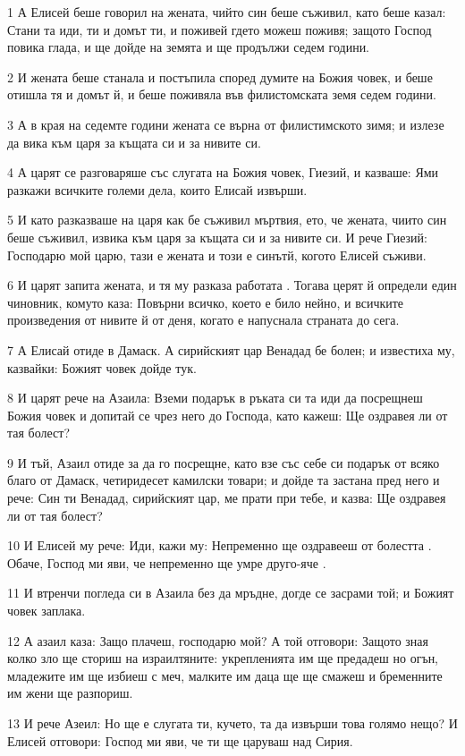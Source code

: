\par 1 А Елисей беше говорил на жената, чийто син беше съживил, като беше казал: Стани та иди, ти и домът ти, и поживей гдето можеш поживя; защото Господ повика глада, и ще дойде на земята и ще продължи седем години.
\par 2 И жената беше станала и постъпила според думите на Божия човек, и беше отишла тя и домът й, и беше поживяла във филистомската земя седем години.
\par 3 А в края на седемте години жената се върна от филистимското зимя; и излезе да вика към царя за къщата си и за нивите си.
\par 4 А царят се разговаряше със слугата на Божия човек, Гиезий, и казваше: Ями разкажи всичките големи дела, които Елисай извърши.
\par 5 И като разказваше на царя как бе съживил мъртвия, ето, че жената, чиито син беше съживил, извика към царя за къщата си и за нивите си. И рече Гиезий: Господарю мой царю, тази е жената и този е синътй, когото Елисей съживи.
\par 6 И царят запита жената, и тя му разказа работата . Тогава церят й определи един чиновник, комуто каза: Повърни всичко, което е било нейно, и всичките произведения от нивите й от деня, когато е напуснала страната до сега.
\par 7 А Елисай отиде в Дамаск. А сирийският цар Венадад бе болен; и известиха му, казвайки: Божият човек дойде тук.
\par 8 И царят рече на Азаила: Вземи подарък в ръката си та иди да посрещнеш Божия човек и допитай се чрез него до Господа, като кажеш: Ще оздравея ли от тая болест?
\par 9 И тъй, Азаил отиде за да го посрещне, като взе със себе си подарък от всяко благо от Дамаск, четиридесет камилски товари; и дойде та застана пред него и рече: Син ти Венадад, сирийският цар, ме прати при тебе, и казва: Ще оздравея ли от тая болест?
\par 10 И Елисей му рече: Иди, кажи му: Непременно ще оздравееш от болестта . Обаче, Господ ми яви, че непременно ще умре друго-яче .
\par 11 И втренчи погледа си в Азаила без да мръдне, догде се засрами той; и Божият човек заплака.
\par 12 А азаил каза: Защо плачеш, господарю мой? А той отговори: Защото зная колко зло ще сториш на израилтяните: укрепленията им ще предадеш но огън, младежите им ще избиеш с меч, малките им даца ще ще смажеш и бременните им жени ще разпориш.
\par 13 И рече Азеил: Но ще е слугата ти, кучето, та да извърши това голямо нещо? И Елисей отговори: Господ ми яви, че ти ще царуваш над Сирия.
